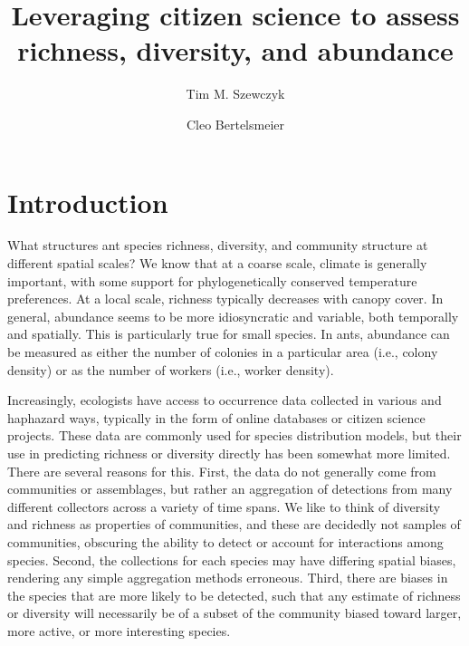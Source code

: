 \documentclass[10pt,a4paper,draft]{article}
\title{Leveraging citizen science to assess richness, diversity, and abundance}
\author[1]{Tim M. Szewczyk}
\author[1]{Cleo Bertelsmeier}
\affil[1]{University of Lausanne}
\date{} %
\begin{document}
\maketitle

\linenumbers








\section{Introduction}
What structures ant species richness, diversity, and community structure at different spatial scales? We know that at a coarse scale, climate is generally important, with some support for phylogenetically conserved temperature preferences. At a local scale, richness typically decreases with canopy cover. In general, abundance seems to be more idiosyncratic and variable, both temporally and spatially. This is particularly true for small species. In ants, abundance can be measured as either the number of colonies in a particular area (i.e., colony density) or as the number of workers (i.e., worker density). 

Increasingly, ecologists have access to occurrence data collected in various and haphazard ways, typically in the form of online databases or citizen science projects. These data are commonly used for species distribution models, but their use in predicting richness or diversity directly has been somewhat more limited. There are several reasons for this. First, the data do not generally come from communities or assemblages, but rather an aggregation of detections from many different collectors across a variety of time spans. We like to think of diversity and richness as properties of communities, and these are decidedly not samples of communities, obscuring the ability to detect or account for interactions among species. Second, the collections for each species may have differing spatial biases, rendering any simple aggregation methods erroneous. Third, there are biases in the species that are more likely to be detected, such that any estimate of richness or diversity will necessarily be of a subset of the community biased toward larger, more active, or more interesting species.
\end{document}
